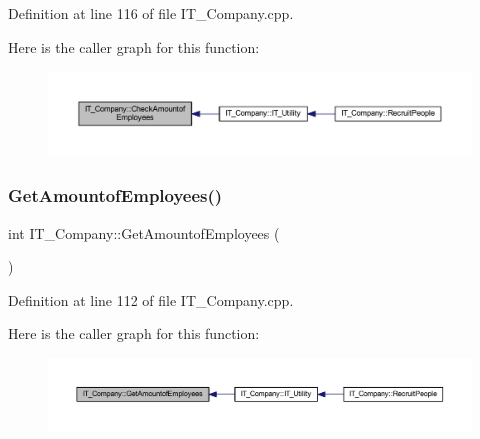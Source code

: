 Definition at line 116 of file I\+T\+\_\+\+Company.\+cpp.

Here is the caller graph for this function\+:
\nopagebreak
\begin{figure}[H]
\begin{center}
\leavevmode
\includegraphics[width=350pt]{class_i_t___company_a8214142064b5b8f6fed854b45f83a2aa_icgraph}
\end{center}
\end{figure}
\mbox{\label{class_i_t___company_ad5210ab4e6ef0a7c9b218678645410e4}} 
\subsubsection{\texorpdfstring{Get\+Amountof\+Employees()}{GetAmountofEmployees()}}
{\footnotesize\ttfamily int I\+T\+\_\+\+Company\+::\+Get\+Amountof\+Employees (\begin{DoxyParamCaption}{ }\end{DoxyParamCaption})}



Definition at line 112 of file I\+T\+\_\+\+Company.\+cpp.

Here is the caller graph for this function\+:
\nopagebreak
\begin{figure}[H]
\begin{center}
\leavevmode
\includegraphics[width=350pt]{class_i_t___company_ad5210ab4e6ef0a7c9b218678645410e4_icgraph}
\end{center}
\end{figure}
\mbox{\label{class_i_t___company_addd5ab4a8699d8df60fd2cd00a4f9875}} 
